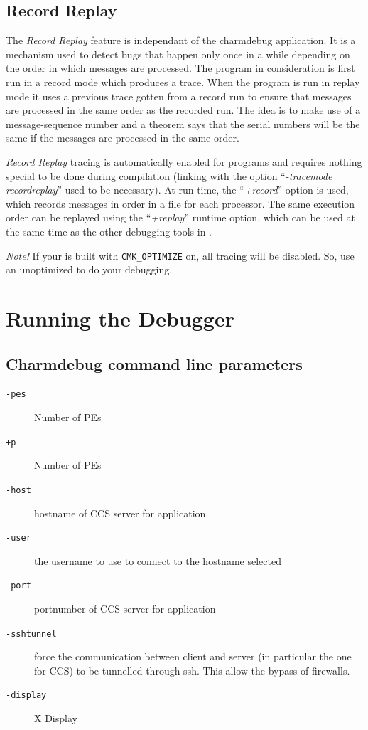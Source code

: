 \documentclass[10pt]{article}
\begin{document}
\subsection{Record Replay}

The \textit{Record Replay} feature is independant of the charmdebug
application.  It is a mechanism used to detect bugs that happen only
once in a while depending on the order in which messages are
processed. The program in consideration is first run in a record mode
which produces a trace. When the program is run in replay mode it uses
a previous trace gotten from a record run to ensure that messages are
processed in the same order as the recorded run. The idea is to make
use of a message-sequence number and a theorem says that the serial
numbers will be the same if the messages are processed in the same
order. \cite{rashmithesis}

\textit{Record Replay} tracing is automatically enabled for \charmpp{}
programs and requires nothing special to be done during compilation
(linking with the option ``\textit{-tracemode recordreplay}'' used to
be necessary).  At run time, the ``\textit{+record}'' option is used,
which records messages in order in a file for each processor.  The
same execution order can be replayed using the ``\textit{+replay}''
runtime option, which can be used at the same time as the other
debugging tools in \charmpp{}.

\emph{ Note! } If your \charmpp{} is built with {\tt CMK\_OPTIMIZE} on,
all tracing will be disabled. So, use an unoptimized \charmpp{} to do your
debugging.

\section{Running the Debugger}

\subsection{Charmdebug command line parameters}

\begin{description}

\item[{\tt -pes}] Number of PEs 

\item[{\tt +p}] Number of PEs 

\item[{\tt -host}] hostname of CCS server for application

\item[{\tt -user}] the username to use to connect to the hostname selected

\item[{\tt -port}] portnumber of CCS server for application

\item[{\tt -sshtunnel}] force the communication between client and server
(in particular the one for CCS) to be tunnelled through ssh. This allow the
bypass of firewalls.

\item[{\tt -display}] X Display

\end{description}
\end{document}
